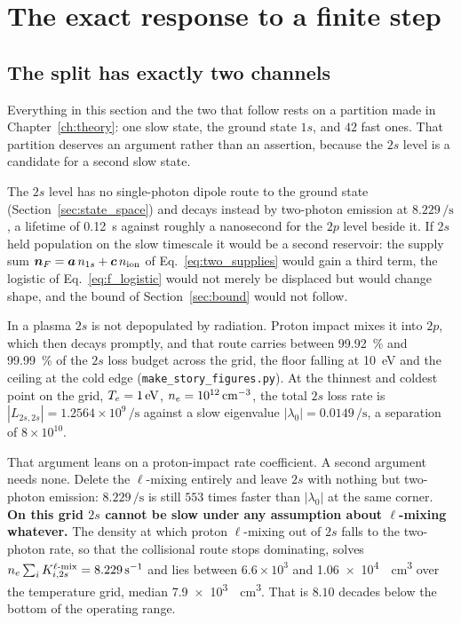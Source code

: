 \section{The exact response to a finite step}
\label{sec:exact_decomposition}

\subsection{The split has exactly two channels}
\label{sec:slow_subspace}

Everything in this section and the two that follow rests on a partition made in
Chapter~\ref{ch:theory}: one slow state, the ground state $1s$, and $42$ fast
ones. That partition deserves an argument rather than an assertion, because
the $2s$ level is a candidate for a second slow state.

The $2s$ level has no single-photon dipole route to the ground state
(Section~\ref{sec:state_space}) and decays instead by two-photon emission at
$8.229\,\si{\per\second}$, a lifetime of \SI{0.12}{\second} against roughly a
nanosecond for the $2p$ level beside it.
If $2s$ held population on the slow timescale it would be a second reservoir:
the supply sum $\bm{n}_{F} = \bm{a}\,n_{1s} + \bm{c}\,n_{\mathrm{ion}}$ of
Eq.~\eqref{eq:two_supplies} would gain a third term, the logistic of
Eq.~\eqref{eq:f_logistic} would not merely be displaced but would change shape,
and the bound of Section~\ref{sec:bound} would not follow.

In a plasma $2s$ is not depopulated by radiation. Proton impact mixes it into
$2p$, which then decays promptly, and that route carries between \SI{99.92}{\percent}
and \SI{99.99}{\percent} of the $2s$ loss budget across the grid, the floor
falling at \SI{10}{\electronvolt} and the ceiling at the cold edge
(\texttt{make\_story\_figures.py}). At the thinnest and coldest point on the grid,
$T_e = \SI{1}{\electronvolt}$, $n_e = \SI{e12}{\per\cubic\centi\metre}$, the
total $2s$ loss rate is
$|L_{2s,2s}| = 1.2564\times10^{9}\,\si{\per\second}$ against a slow
eigenvalue $|\lambda_0| = 0.0149\,\si{\per\second}$, a separation of
$8\times10^{10}$.

That argument leans on a proton-impact rate coefficient. A second argument
needs none. Delete the $\ell$-mixing entirely and leave $2s$ with
nothing but two-photon emission: $8.229\,\si{\per\second}$ is still $553$
times faster than $|\lambda_0|$ at the same corner. \textbf{On this grid $2s$
cannot be slow under any assumption about $\ell$-mixing whatever.} The density at which
proton $\ell$-mixing out of $2s$ falls to the two-photon rate, so that the
collisional route stops dominating, solves
$n_e\sum_i K^{\ell\text{-mix}}_{i,2s} = \SI{8.229}{\per\second}$ and lies
between $6.6\times10^{3}$ and \SI{1.06e4}{\per\cubic\centi\metre} over the
temperature grid, median \SI{7.9e3}{\per\cubic\centi\metre}. That is $8.10$
decades below the bottom of the operating range.

